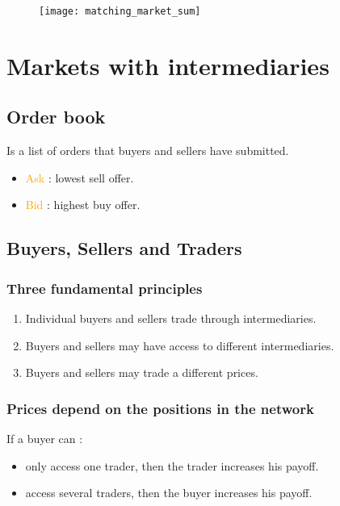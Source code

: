 \begin{figure}[H]
    \centering
    \texttt{[image: matching\_market\_sum]}
\end{figure}

\section{Markets with intermediaries}

\subsection{Order book}

Is a list of orders that buyers and sellers have submitted.

\begin{itemize}
\item \textcolor{orange}{Ask} : lowest sell offer.
\item \textcolor{orange}{Bid} : highest buy offer.
\end{itemize}

\subsection{Buyers, Sellers and Traders}

\subsubsection{Three fundamental principles}

\begin{enumerate}
\item Individual buyers and sellers trade through intermediaries.
\item Buyers and sellers may have access to different intermediaries.
\item Buyers and sellers may trade a different prices.
\end{enumerate}

\subsubsection{Prices depend on the positions in the network}

If a buyer can :
\begin{itemize}
\item only access one trader, then the trader increases his payoff.
\item access several traders, then the buyer increases his payoff.
\end{itemize}

